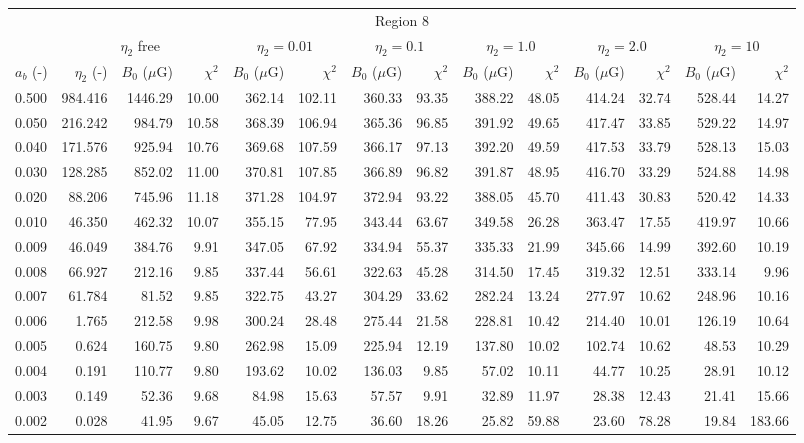 \begin{tabular}{@{}lrrrrrrrrrrrrr@{}}
\toprule
\multicolumn{14}{c}{Region 8} \\
\cmidrule{1-14}
{} & \multicolumn{3}{c}{$\eta_2$ free} & \multicolumn{2}{c}{$\eta_2 = 0.01$}
   & \multicolumn{2}{c}{$\eta_2 = 0.1$} & \multicolumn{2}{c}{$\eta_2 = 1.0$}
   & \multicolumn{2}{c}{$\eta_2 = 2.0$} & \multicolumn{2}{c}{$\eta_2 = 10$} \\
\cmidrule(lr){2-4} \cmidrule(lr){5-6} \cmidrule(lr){7-8} \cmidrule(lr){9-10}
    \cmidrule(lr){11-12} \cmidrule(lr){13-14}
$a_b$ (-) & $\eta_2$ (-) & $B_0$ ($\mu$G) & $\chi^2$
& $B_0$ ($\mu$G) & $\chi^2$ & $B_0$ ($\mu$G) & $\chi^2$
& $B_0$ ($\mu$G) & $\chi^2$ & $B_0$ ($\mu$G) & $\chi^2$
& $B_0$ ($\mu$G) & $\chi^2$ \\
\cmidrule{1-14}
0.500 & 984.416 & 1446.29 & 10.00 & 362.14 & 102.11 & 360.33 & 93.35 & 388.22 & 48.05 & 414.24 & 32.74 & 528.44 & 14.27 \\
0.050 & 216.242 & 984.79 & 10.58 & 368.39 & 106.94 & 365.36 & 96.85 & 391.92 & 49.65 & 417.47 & 33.85 & 529.22 & 14.97 \\
0.040 & 171.576 & 925.94 & 10.76 & 369.68 & 107.59 & 366.17 & 97.13 & 392.20 & 49.59 & 417.53 & 33.79 & 528.13 & 15.03 \\
0.030 & 128.285 & 852.02 & 11.00 & 370.81 & 107.85 & 366.89 & 96.82 & 391.87 & 48.95 & 416.70 & 33.29 & 524.88 & 14.98 \\
0.020 & 88.206 & 745.96 & 11.18 & 371.28 & 104.97 & 372.94 & 93.22 & 388.05 & 45.70 & 411.43 & 30.83 & 520.42 & 14.33 \\
0.010 & 46.350 & 462.32 & 10.07 & 355.15 & 77.95 & 343.44 & 63.67 & 349.58 & 26.28 & 363.47 & 17.55 & 419.97 & 10.66 \\
0.009 & 46.049 & 384.76 & 9.91 & 347.05 & 67.92 & 334.94 & 55.37 & 335.33 & 21.99 & 345.66 & 14.99 & 392.60 & 10.19 \\
0.008 & 66.927 & 212.16 & 9.85 & 337.44 & 56.61 & 322.63 & 45.28 & 314.50 & 17.45 & 319.32 & 12.51 & 333.14 & 9.96 \\
0.007 & 61.784 & 81.52 & 9.85 & 322.75 & 43.27 & 304.29 & 33.62 & 282.24 & 13.24 & 277.97 & 10.62 & 248.96 & 10.16 \\
0.006 & 1.765 & 212.58 & 9.98 & 300.24 & 28.48 & 275.44 & 21.58 & 228.81 & 10.42 & 214.40 & 10.01 & 126.19 & 10.64 \\
0.005 & 0.624 & 160.75 & 9.80 & 262.98 & 15.09 & 225.94 & 12.19 & 137.80 & 10.02 & 102.74 & 10.62 & 48.53 & 10.29 \\
0.004 & 0.191 & 110.77 & 9.80 & 193.62 & 10.02 & 136.03 & 9.85 & 57.02 & 10.11 & 44.77 & 10.25 & 28.91 & 10.12 \\
0.003 & 0.149 & 52.36 & 9.68 & 84.98 & 15.63 & 57.57 & 9.91 & 32.89 & 11.97 & 28.38 & 12.43 & 21.41 & 15.66 \\
0.002 & 0.028 & 41.95 & 9.67 & 45.05 & 12.75 & 36.60 & 18.26 & 25.82 & 59.88 & 23.60 & 78.28 & 19.84 & 183.66 \\


\end{tabular}
